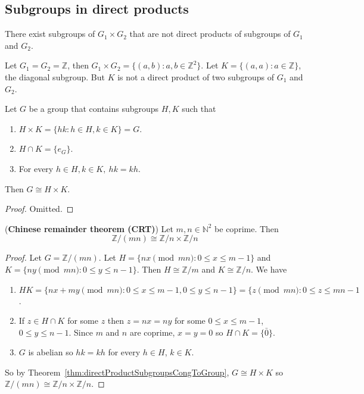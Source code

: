 \subsection{Subgroups in direct products}

\begin{example}
	There exist subgroups of $G_1 \times G_2$ that are not direct products of subgroups of $G_1$ and $G_2$.

	Let $G_1 = G_2 = \mathbb{Z}$, then $G_1 \times G_2 = \{ (a, b): a, b \in \mathbb{Z}^2 \}$. Let $K = \{ (a, a): a \in \mathbb{Z} \}$, the diagonal subgroup. But $K$ is not a direct product of two subgroups of $G_1$ and $G_2$.
\end{example}

\begin{theorem}\label{thm:directProductSubgroupsCongToGroup}
	Let $G$ be a group that contains subgroups $H, K$ such that
	\begin{enumerate}
		\item $H \times K = \{ hk: h \in H, k \in K \} = G$.
		\item $H \cap K = \{ e_G \}$.
		\item For every $h \in H, k \in K, \ hk = kh$.
	\end{enumerate}
	Then $G \cong H \times K$.
\end{theorem}

\begin{proof}
	Omitted.
\end{proof}

\begin{theorem}
	(\textbf{Chinese remainder theorem (CRT)}) Let $m, n \in \mathbb{N}^2$ be coprime. Then
	\[
		\mathbb{Z} / (mn) \cong \mathbb{Z} / n \times \mathbb{Z} / n
	\]
\end{theorem}

\begin{proof}
	Let $G = \mathbb{Z} / (mn)$. Let $H = \{ nx \pmod{mn}: 0 \le x \le m - 1 \}$ and $K = \{ ny \pmod{mn}: 0 \le y \le n - 1 \}$. Then $H \cong \mathbb{Z} / m$ and $K \cong \mathbb{Z} / n$. We have
	\begin{enumerate}
		\item $H K = \{ nx + my \pmod{mn}: 0 \le x \le m - 1, 0 \le y \le n - 1 \} = \{ z \pmod{mn}: 0 \le z \le mn - 1$.
		\item If $z \in H \cap K$ for some $z$ then $z = nx = ny$ for some $0 \le x \le m - 1$, $0 \le y \le n - 1$. Since $m$ and $n$ are coprime, $x = y = 0$ so $H \cap K = \{ \bar{0} \}$.
		\item $G$ is abelian so $h k = k h$ for every $h \in H$, $k \in K$.
	\end{enumerate}
	So by Theorem~\ref{thm:directProductSubgroupsCongToGroup}, $G \cong H \times K$ so $\mathbb{Z} / (mn) \cong \mathbb{Z} / n \times \mathbb{Z} / n$.
\end{proof}

